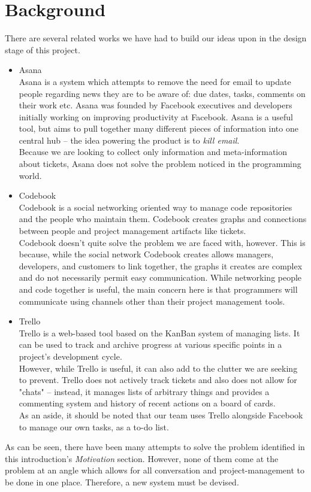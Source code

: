 \documentclass[10pt]{article}
\begin{document}
\section{Background}
There are several related works we have had to build our ideas upon in the design stage of this project. 
\begin{itemize}
\item Asana\\
Asana is a system which attempts to remove the need for email to update people regarding news they are to be aware of: due dates, tasks, comments on their work etc. Asana was founded by Facebook executives and developers initially working on improving productivity at Facebook. Asana is a useful tool, but aims to pull together many different pieces of information into one central hub -- the idea powering the product is to \emph{kill email}. \\
Because we are looking to collect only information and meta-information about tickets, Asana does not solve the problem noticed in the programming world. 
\item Codebook \\
Codebook is a social networking oriented way to manage code repositories and the people who maintain them. Codebook creates graphs and connections between people and project management artifacts like tickets.\\
Codebook doesn't quite solve the problem we are faced with, however. This is because, while the social network Codebook creates allows managers, developers, and customers to link together, the graphs it creates are complex and do not necessarily permit easy communication. While networking people and code together is useful, the main concern here is that programmers will communicate using channels other than their project management tools. 
\item Trello \\
Trello is a web-based tool based on the KanBan system of managing lists. It can be used to track and archive progress at various specific points in a project's development cycle. \\
However, while Trello is useful, it can also add to the clutter we are seeking to prevent. Trello does not actively track tickets and also does not allow for "chats" -- instead, it manages lists of arbitrary things and provides a commenting system and history of recent actions on a board of cards. \\
As an aside, it should be noted that our team uses Trello alongside Facebook to manage our own tasks, as a to-do list. 
\end{itemize}
\par As can be seen, there have been many attempts to solve the problem identified in this introduction's \emph{Motivation} section. However, none of them come at the problem at an angle which allows for all conversation and project-management to be done in one place. Therefore, a new system must be devised. 
\end{document}

